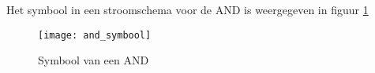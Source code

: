 Het symbool in een stroomschema voor de AND is weergegeven in figuur \ref{symbool:and}

\begin{figure}[h]
\texttt{[image: and\_symbool]}
\centering
\caption{Symbool van een AND}
\label{symbool:and}
\end{figure}

